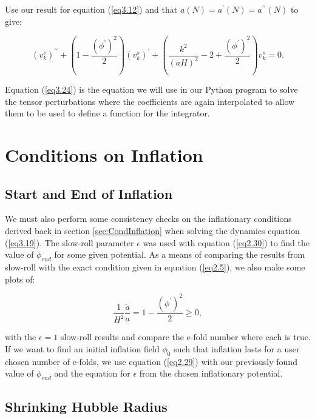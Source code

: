\documentclass[a4paper,12pt,twoside]{report}
\begin{document}
Use our result for equation (\ref{eq3.12}) and that $a(N) = a^{\prime}(N) = a^{\prime \prime}(N)$ to give:

\begin{equation} \label{eq3.24}
(v^{s}_{k})^{\prime \prime} + \left( 1 - \frac{(\phi^{\prime})^{2}}{2} \right)(v^{s}_{k})^{\prime} + \left( \frac{k^{2}}{(aH)^{2}} - 2 + \frac{(\phi^{\prime})^{2}}{2} \right)v^{s}_{k} = 0.
\end{equation}

Equation (\ref{eq3.24}) is the equation we will use in our Python program to solve the tensor perturbations where the coefficients are again interpolated to allow them to be used to define a function for the integrator.

\section{Conditions on Inflation} \label{sec:CondInflat}

\subsection{Start and End of Inflation} \label{subsec:StartEndInflat}

We must also perform some consistency checks on the inflationary conditions derived back in section \ref{sec:CondInflation} when solving the dynamics equation (\ref{eq3.19}). The slow-roll parameter $\epsilon$ was used with equation (\ref{eq2.30}) to find the value of $\phi_{end}$ for some given potential. As a means of comparing the results from slow-roll with the exact condition given in equation (\ref{eq2.5}), we also make some plots of:

\begin{equation} \label{eq3.25}
\frac{1}{H^{2}} \frac{\ddot{a}}{a} = 1 - \frac{(\phi^{\prime})^{2}}{2} \ge 0,
\end{equation}

with the $\epsilon = 1$ slow-roll results and compare the e-fold number where each is true. If we want to find an initial inflation field $\phi_{0}$ such that inflation lasts for a user chosen number of e-folds, we use equation (\ref{eq2.29}) with our previously found value of $\phi_{end}$ and the equation for $\epsilon$ from the chosen inflationary potential. 

\subsection{Shrinking Hubble Radius} \label{subsec:ShrinkHubRad}
\end{document}
